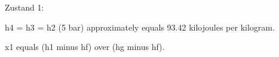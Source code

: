 Zustand 1: 

h4 = h3 = h2 (5 bar) approximately equals 93.42 kilojoules per kilogram.

x1 equals (h1 minus hf) over (hg minus hf).